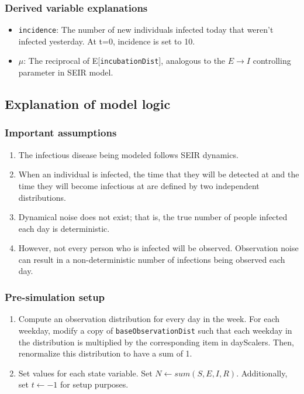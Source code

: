 \documentclass{article}
\newcommand{\code}[1]{\texttt{#1}}
\begin{document}
\subsubsection{Derived variable explanations}
\begin{itemize}
    \item \code{incidence}: The number of new individuals infected today that weren't infected yesterday. At t=0, incidence is set to 10.
    \item $\mu$: The reciprocal of E[\code{incubationDist}], analogous to the $E \rightarrow I$ controlling parameter in SEIR model.
\end{itemize}

\subsection{Explanation of model logic}

\subsubsection{Important assumptions}

\begin{enumerate}
	\item The infectious disease being modeled follows SEIR dynamics.
	\item When an individual is infected, the time that they will be detected at and the time they will become infectious at are defined by two independent distributions.
	\item Dynamical noise does not exist; that is, the true number of people infected each day is deterministic.  
	\item However, not every person who is infected will be observed. Observation noise can result in a non-deterministic number of infections being observed each day. 

\end{enumerate}

\subsubsection{Pre-simulation setup}

\begin{enumerate}
    \item Compute an observation distribution for every day in the week. For each weekday, modify a copy of \code{baseObservationDist} such that each weekday in the distribution is multiplied by the corresponding item in dayScalers. Then, renormalize this distribution to have a sum of 1.
    
    \item Set values for each state variable. Set $N \gets sum(S, E, I, R)$. Additionally, set $t \gets -1$ for setup purposes.

\end{enumerate}
\end{document}
